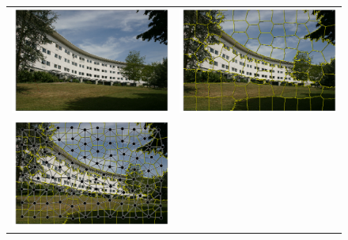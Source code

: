 \begin{figure}
    \begin{tabu} to 
    \includegraphics[width=\linewidth]{structured_prediction/images/scene_sp_org}&%
    \includegraphics[width=\linewidth]{structured_prediction/images/scene_sp}\\
    \includegraphics[width=\linewidth]{structured_prediction/images/scene_sp_graph}&%

\end{tabu}
\end{figure}
